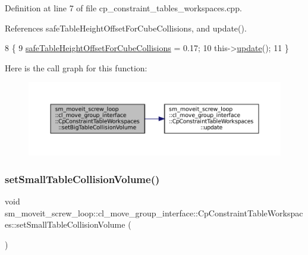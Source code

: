 Definition at line 7 of file cp\+\_\+constraint\+\_\+tables\+\_\+workspaces.\+cpp.



References safe\+Table\+Height\+Offset\+For\+Cube\+Collisions, and update().


\begin{DoxyCode}
8         \{
9             \hyperlink{classsm__moveit__screw__loop_1_1cl__move__group__interface_1_1CpConstraintTableWorkspaces_aef6283c1b9bc7b0aeb7c106b6e70a055}{safeTableHeightOffsetForCubeCollisions} = 0.17;
10             this->\hyperlink{classsm__moveit__screw__loop_1_1cl__move__group__interface_1_1CpConstraintTableWorkspaces_a873050debbad5977c78beb93a0b6ce77}{update}();
11         \}
\end{DoxyCode}
Here is the call graph for this function\+:
\nopagebreak
\begin{figure}[H]
\begin{center}
\leavevmode
\includegraphics[width=350pt]{classsm__moveit__screw__loop_1_1cl__move__group__interface_1_1CpConstraintTableWorkspaces_af5dbacf9dce9270788273a44ad4cbea4_cgraph}
\end{center}
\end{figure}
\mbox{\label{classsm__moveit__screw__loop_1_1cl__move__group__interface_1_1CpConstraintTableWorkspaces_a602bb7b5acc3f249b59516ce071fd8ea}} 
\subsubsection{\texorpdfstring{set\+Small\+Table\+Collision\+Volume()}{setSmallTableCollisionVolume()}}
{\footnotesize\ttfamily void sm\+\_\+moveit\+\_\+screw\+\_\+loop\+::cl\+\_\+move\+\_\+group\+\_\+interface\+::\+Cp\+Constraint\+Table\+Workspaces\+::set\+Small\+Table\+Collision\+Volume (\begin{DoxyParamCaption}{ }\end{DoxyParamCaption})}



